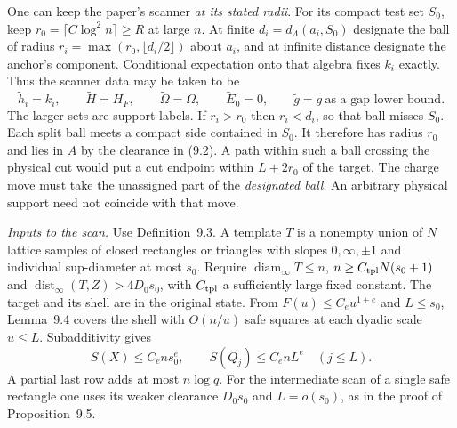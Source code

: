 \documentclass[aps,prb,onecolumn,10pt,nofootinbib]{revtex4-2}
\newcommand{\dist}{\operatorname{dist}}
\newcommand{\diam}{\operatorname{diam}}
\begin{document}
One can keep the paper's scanner \emph{at its stated radii}. For its compact test set $S_0$, keep $r_0=\lceil C\log^2 n\rceil\ge R$ at large $n$. At finite $d_i=d_\Lambda(a_i,S_0)$ designate the ball of radius $r_i=\max(r_0,\lfloor d_i/2\rfloor)$ about $a_i$, and at infinite distance designate the anchor's component. Conditional expectation onto that algebra fixes $k_i$ exactly. Thus the scanner data may be taken to be
\begin{equation}
 \widetilde h_i=k_i,\qquad \widetilde H=H_F,\qquad
 \widetilde\Omega=\Omega,\qquad \widetilde E_0=0,\qquad
 \widetilde g=g\ \text{as a gap lower bound}.
 \label{eq:identity}
\end{equation}
The larger sets are support labels. If $r_i>r_0$ then $r_i<d_i$, so that ball misses $S_0$. Each split ball meets a compact side contained in $S_0$. It therefore has radius $r_0$ and lies in $A$ by the clearance in (9.2). A path within such a ball crossing the physical cut would put a cut endpoint within $L+2r_0$ of the target. The charge move must take the unassigned part of the \emph{designated ball}. An arbitrary physical support need not coincide with that move.

\emph{Inputs to the scan.}
Use Definition~9.3. A template $T$ is a nonempty union of $N$ lattice samples of closed rectangles or triangles with slopes $0,\infty,\pm1$ and individual sup-diameter at most $s_0$. Require $\diam_\infty T\le n$, $n\ge C_{\rm tpl}N(s_0+1)$ and $\dist_\infty(T,Z)>4D_0s_0$, with $C_{\rm tpl}$ a sufficiently large fixed constant. The target and its shell are in the original state. From $F(u)\le C_e u^{1+e}$ and $L\le s_0$, Lemma~9.4 covers the shell with $O(n/u)$ safe squares at each dyadic scale $u\le L$. Subadditivity gives
\[
 S(X)\le C_e n s_0^e,\qquad S(Q_j)\le C_e nL^e\quad (j\le L).
\]
A partial last row adds at most $n\log q$. For the intermediate scan of a single safe rectangle one uses its weaker clearance $D_0s_0$ and $L=o(s_0)$, as in the proof of Proposition~9.5.
\end{document}
